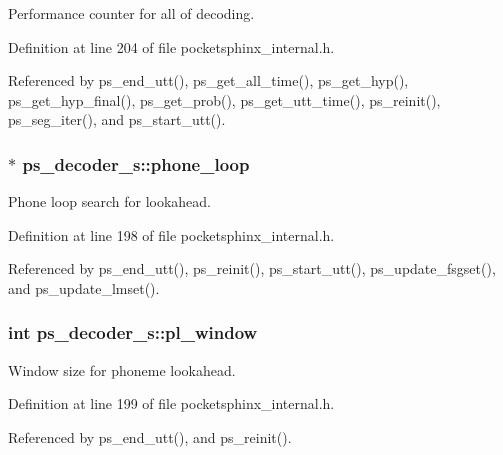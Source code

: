 \-Performance counter for all of decoding. 



\-Definition at line 204 of file pocketsphinx\-\_\-internal.\-h.



\-Referenced by ps\-\_\-end\-\_\-utt(), ps\-\_\-get\-\_\-all\-\_\-time(), ps\-\_\-get\-\_\-hyp(), ps\-\_\-get\-\_\-hyp\-\_\-final(), ps\-\_\-get\-\_\-prob(), ps\-\_\-get\-\_\-utt\-\_\-time(), ps\-\_\-reinit(), ps\-\_\-seg\-\_\-iter(), and ps\-\_\-start\-\_\-utt().

\subsubsection[{phone\-\_\-loop}]{$\ast$ {\bf ps\-\_\-decoder\-\_\-s\-::phone\-\_\-loop}}\label{structps__decoder__s_a0c6d141d7a71a1287be00a1ebcc7643d}


\-Phone loop search for lookahead. 



\-Definition at line 198 of file pocketsphinx\-\_\-internal.\-h.



\-Referenced by ps\-\_\-end\-\_\-utt(), ps\-\_\-reinit(), ps\-\_\-start\-\_\-utt(), ps\-\_\-update\-\_\-fsgset(), and ps\-\_\-update\-\_\-lmset().

\subsubsection[{pl\-\_\-window}]{\setlength{\rightskip}{0pt plus 5cm}int {\bf ps\-\_\-decoder\-\_\-s\-::pl\-\_\-window}}\label{structps__decoder__s_a0f0a6681ffd98af789f6bed556c814e4}


\-Window size for phoneme lookahead. 



\-Definition at line 199 of file pocketsphinx\-\_\-internal.\-h.



\-Referenced by ps\-\_\-end\-\_\-utt(), and ps\-\_\-reinit().

